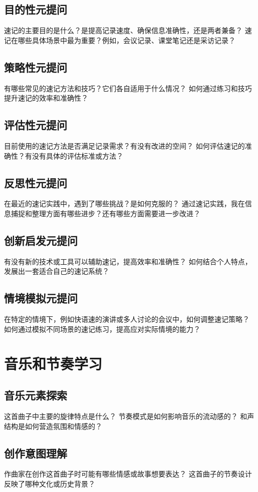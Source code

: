 \documentclass[12pt]{book}
\begin{document}
\subsection{目的性元提问}
速记的主要目的是什么？是提高记录速度、确保信息准确性，还是两者兼备？
速记在哪些具体场景中最为重要？例如，会议记录、课堂笔记还是采访记录？

\subsection{策略性元提问}
有哪些常见的速记方法和技巧？它们各自适用于什么情况？
如何通过练习和技巧提升速记的效率和准确性？

\subsection{评估性元提问}
目前使用的速记方法是否满足记录需求？有没有改进的空间？
如何评估速记的准确性？有没有具体的评估标准或方法？

\subsection{反思性元提问}
在最近的速记实践中，遇到了哪些挑战？是如何克服的？
通过速记实践，我在信息捕捉和整理方面有哪些进步？还有哪些方面需要进一步改进？

\subsection{创新启发元提问}
有没有新的技术或工具可以辅助速记，提高效率和准确性？
如何结合个人特点，发展出一套适合自己的速记系统？

\subsection{情境模拟元提问}
在特定的情境下，例如快语速的演讲或多人讨论的会议中，如何调整速记策略？
如何通过模拟不同场景的速记练习，提高应对实际情境的能力？


\section{音乐和节奏学习}
\subsection{音乐元素探索}
这首曲子中主要的旋律特点是什么？
节奏模式是如何影响音乐的流动感的？
和声结构是如何营造氛围和情感的？

\subsection{创作意图理解}
作曲家在创作这首曲子时可能有哪些情感或故事想要表达？
这首曲子的节奏设计反映了哪种文化或历史背景？
\end{document}
